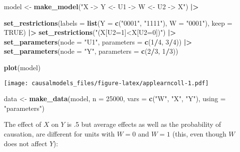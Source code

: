 \documentclass[
  12pt,
]{book}
\newenvironment{Shaded}{\begin{snugshade}}{\end{snugshade}}
\newcommand{\AttributeTok}[1]{\textcolor[rgb]{0.13,0.29,0.53}{#1}}
\newcommand{\ConstantTok}[1]{\textcolor[rgb]{0.56,0.35,0.01}{#1}}
\newcommand{\DecValTok}[1]{\textcolor[rgb]{0.00,0.00,0.81}{#1}}
\newcommand{\FunctionTok}[1]{\textcolor[rgb]{0.13,0.29,0.53}{\textbf{#1}}}
\newcommand{\NormalTok}[1]{#1}
\newcommand{\OtherTok}[1]{\textcolor[rgb]{0.56,0.35,0.01}{#1}}
\newcommand{\SpecialCharTok}[1]{\textcolor[rgb]{0.81,0.36,0.00}{\textbf{#1}}}
\newcommand{\StringTok}[1]{\textcolor[rgb]{0.31,0.60,0.02}{#1}}
\begin{document}
\begin{Shaded}
\begin{Highlighting}[]
\NormalTok{model }\OtherTok{\textless{}{-}} \FunctionTok{make\_model}\NormalTok{(}\StringTok{"X {-}\textgreater{} Y \textless{}{-} U1 {-}\textgreater{} W \textless{}{-} U2 {-}\textgreater{} X"}\NormalTok{) }\SpecialCharTok{|\textgreater{}}
  
  \FunctionTok{set\_restrictions}\NormalTok{(}\AttributeTok{labels =} \FunctionTok{list}\NormalTok{(}\AttributeTok{Y =} \FunctionTok{c}\NormalTok{(}\StringTok{"0001"}\NormalTok{, }\StringTok{"1111"}\NormalTok{), }\AttributeTok{W =} \StringTok{"0001"}\NormalTok{), }\AttributeTok{keep =} \ConstantTok{TRUE}\NormalTok{) }\SpecialCharTok{|\textgreater{}}
  \FunctionTok{set\_restrictions}\NormalTok{(}\StringTok{"(X[U2=1]\textless{}X[U2=0])"}\NormalTok{) }\SpecialCharTok{|\textgreater{}}
  \FunctionTok{set\_parameters}\NormalTok{(}\AttributeTok{node =} \StringTok{"U1"}\NormalTok{,  }\AttributeTok{parameters =} \FunctionTok{c}\NormalTok{(}\DecValTok{1}\SpecialCharTok{/}\DecValTok{4}\NormalTok{, }\DecValTok{3}\SpecialCharTok{/}\DecValTok{4}\NormalTok{)) }\SpecialCharTok{|\textgreater{}}
  \FunctionTok{set\_parameters}\NormalTok{(}\AttributeTok{node =} \StringTok{"Y"}\NormalTok{, }\AttributeTok{parameters =} \FunctionTok{c}\NormalTok{(}\DecValTok{2}\SpecialCharTok{/}\DecValTok{3}\NormalTok{, }\DecValTok{1}\SpecialCharTok{/}\DecValTok{3}\NormalTok{))}

\FunctionTok{plot}\NormalTok{(model)}
\end{Highlighting}
\end{Shaded}

\texttt{[image: causalmodels\_files/figure-latex/applearncoll-1.pdf]}

\begin{Shaded}
\begin{Highlighting}[]
\NormalTok{data }\OtherTok{\textless{}{-}} \FunctionTok{make\_data}\NormalTok{(model, }
                  \AttributeTok{n =} \DecValTok{25000}\NormalTok{, }
                  \AttributeTok{vars =} \FunctionTok{c}\NormalTok{(}\StringTok{"W"}\NormalTok{, }\StringTok{"X"}\NormalTok{, }\StringTok{"Y"}\NormalTok{), }
                  \AttributeTok{using =} \StringTok{"parameters"}\NormalTok{)}
\end{Highlighting}
\end{Shaded}

The effect of \(X\) on \(Y\) is .5 but average effects as well as the probability of causation, are different for units with \(W=0\) and \(W=1\) (this, even though \(W\) does not affect \(Y\)):
\end{document}
